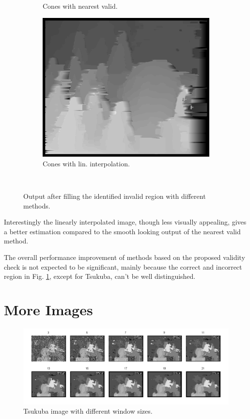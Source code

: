 \documentclass[letterpaper,12pt]{article}
\begin{document}
\begin{figure}[!h]
\begin{subfigure}[b]{0.30\textwidth}
                 \caption{Cones with nearest valid.}
        \end{subfigure}%
        \quad
        \begin{subfigure}[b]{0.30\textwidth}
                \includegraphics[width=\textwidth]{ConesOli.png}
                \caption{Cones with lin. interpolation.}
         \end{subfigure}
\        \caption{Output after filling the identified invalid region with different methods.}
        \label{fig:rat}
\end{figure}

Interestingly the linearly interpolated image, though less visually appealing, gives a better estimation compared to the smooth looking output of the nearest valid method.

The overall performance improvement of methods based on the proposed validity check is not expected to be significant, mainly because the correct and incorrect region in Fig. \ref{fig:rat}, except for Tsukuba, can't be well distinguished.
\newpage
\section{More Images}

\begin{figure}[!h]
\centering
	\includegraphics[width=19cm]{samples2.png}
	\caption{Tsukuba image with different window sizes.}
	\label{fig:more}
\end{figure}




\end{document}

